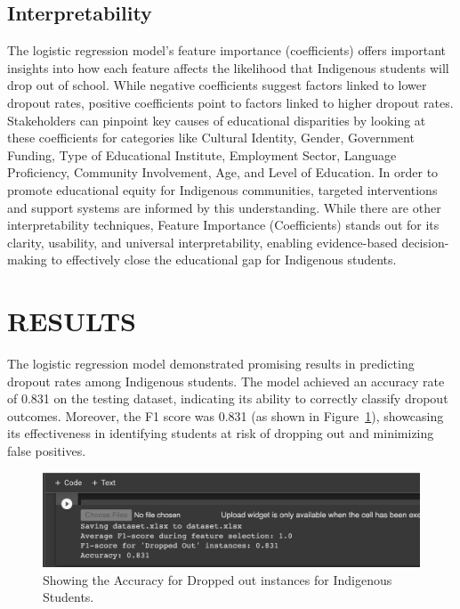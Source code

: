 \documentclass[a4paper,twoside]{article}
\begin{document}
\subsection{Interpretability}
The logistic regression model's feature importance (coefficients) offers important insights into how each feature affects the likelihood that Indigenous students will drop out of school. While negative coefficients suggest factors linked to lower dropout rates, positive coefficients point to factors linked to higher dropout rates. Stakeholders can pinpoint key causes of educational disparities by looking at these coefficients for categories like Cultural Identity, Gender, Government Funding, Type of Educational Institute, Employment Sector, Language Proficiency, Community Involvement, Age, and Level of Education. In order to promote educational equity for Indigenous communities, targeted interventions and support systems are informed by this understanding. While there are other interpretability techniques, Feature Importance (Coefficients) stands out for its clarity, usability, and universal interpretability, enabling evidence-based decision-making to effectively close the educational gap for Indigenous students.

\section{\uppercase{Results}}
The logistic regression model demonstrated promising results in predicting dropout rates among Indigenous students. The model achieved an accuracy rate of 0.831 on the testing dataset, indicating its ability to correctly classify dropout outcomes. Moreover, the F1 score was 0.831 (as shown in Figure~\ref{fig:result}), showcasing its effectiveness in identifying students at risk of dropping out and minimizing false positives.

\begin{figure}[!htb]
	\centering 
	\includegraphics[width=1.0\linewidth,keepaspectratio]{images/Result.png}
        \captionsetup{format=plain, justification=centering}
	\caption{Showing the Accuracy for Dropped out instances for Indigenous Students.} 
	\label{fig:result}
\end{figure}
\end{document}
